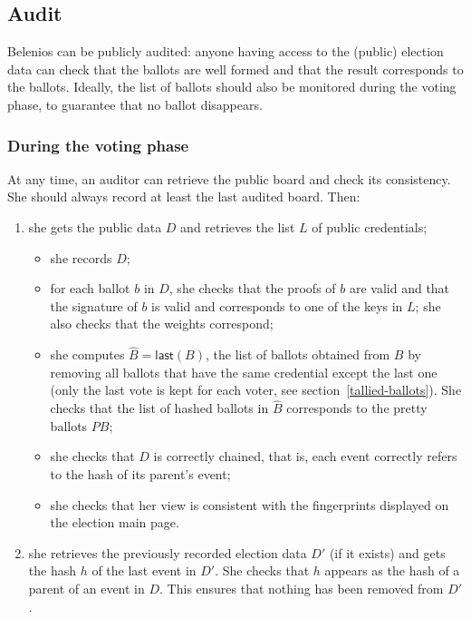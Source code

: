 \documentclass[a4paper]{article}
\begin{document}
\subsection{Audit}

Belenios can be publicly audited: anyone having access to the (public)
election data can check that the ballots are well formed and that the
result corresponds to the ballots. Ideally, the list of ballots should
also be monitored during the voting phase, to guarantee that no ballot
disappears.

\subsubsection{During the voting phase}
\label{sec:audit-voting}
At any time, an auditor can retrieve the public board and check its consistency. She should
always record at least the last audited board. Then:
\begin{enumerate}
\item she gets the public data $D$ and retrieves the list $L$ of
  public credentials;
  \begin{itemize}
  \item she records $D$;
  \item for each ballot $b$ in $D$, she checks that the proofs of $b$ are valid and that
  the signature of $b$ is valid and corresponds to one of the keys in
  $L$; she also checks that the weights correspond;
\item she computes $\hat{B}=\textsf{last}(B)$, the list of ballots
  obtained from $B$ by removing all ballots that have the same
  credential except the last one (only the last vote is kept for each
  voter, see section~\ref{tallied-ballots}). She checks that the list
  of hashed ballots in $\hat{B}$ corresponds to the pretty ballots
  $PB$;
  \item she checks that $D$ is correctly chained, that is, each event correctly
    refers to the hash of its parent's event;
    \item she checks that her view is consistent with the fingerprints
      displayed on the election main page.
  \end{itemize}
\item she retrieves the previously recorded election data $D'$ (if it
  exists) and gets the hash $h$ of the last event in $D'$.
She checks that $h$ appears as the hash of a parent of an event in
$D$.
This ensures that nothing has been removed from $D'$.
\end{enumerate}
\end{document}
